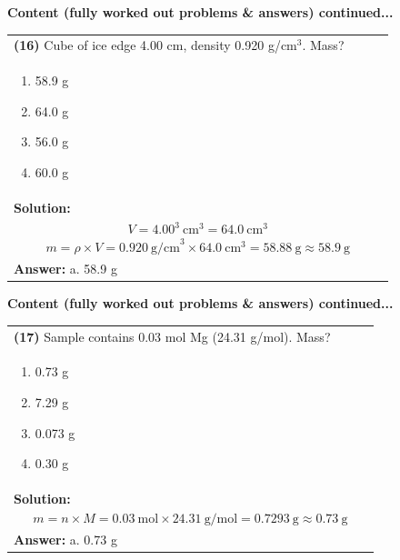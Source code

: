 \documentclass{article}
\begin{document}
{\newpage
\noindent
{\large\textbf{Content (fully worked out problems \& answers) continued...}}\\[0.2em]
\vspace{0.2cm}
\begin{tabular}{|p{0.9\linewidth}|}
\hline
\vspace{0.2cm}
\textbf{(16)} Cube of ice edge 4.00 cm, density 0.920 g/cm$^3$. Mass? \\
\begin{minipage}[t]{0.85\linewidth}
\begin{enumerate}[label=\alph*.]
   \item 58.9 g
   \item 64.0 g
   \item 56.0 g
   \item 60.0 g
\end{enumerate}
\end{minipage}\\
\hline
\vspace{0.2cm}
\textbf{Solution:} \\
\[
V = 4.00^3~\text{cm}^3 = 64.0~\text{cm}^3
\] \\
\[
m = \rho \times V = 0.920~\text{g/cm}^3 \times 64.0~\text{cm}^3 = 58.88~\text{g} \approx 58.9~\text{g}
\] \\ 
\hline
\vspace{0.2cm}
\textbf{Answer:} a. 58.9 g \\
\hline
\end{tabular}

\newpage
\noindent
{\large\textbf{Content (fully worked out problems \& answers) continued...}}\\[0.2em]
\vspace{0.2cm}
\begin{tabular}{|p{0.9\linewidth}|}
\hline
\vspace{0.2cm}
\textbf{(17)} Sample contains 0.03 mol Mg (24.31 g/mol). Mass? \\
\begin{minipage}[t]{0.85\linewidth}
\begin{enumerate}[label=\alph*.]
   \item 0.73 g
   \item 7.29 g
   \item 0.073 g
   \item 0.30 g
\end{enumerate}
\end{minipage}\\
\hline
\vspace{0.2cm}
\textbf{Solution:} \\
\[
m = n \times M = 0.03~\text{mol} \times 24.31~\text{g/mol} = 0.7293~\text{g} \approx 0.73~\text{g}
\] \\ 
\hline
\vspace{0.2cm}
\textbf{Answer:} a. 0.73 g \\
\hline
\end{tabular}

}
\end{document}
